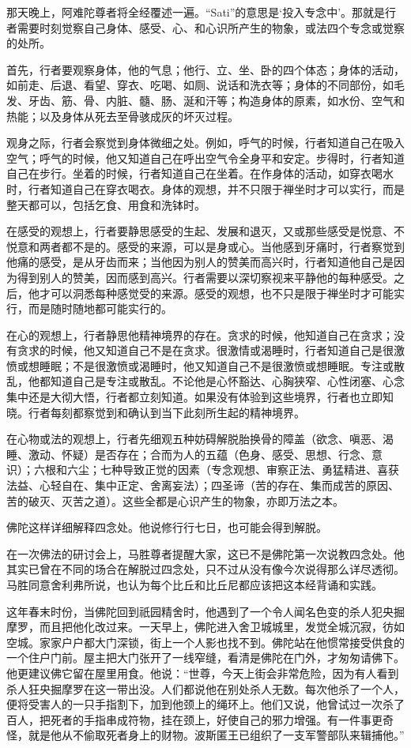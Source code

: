 \documentclass[12pt,twoside,openany]{book}
\begin{document}
那天晚上，阿难陀尊者将全经覆述一遍。“Sati”的意思是‘投入专念中’。那就是行者需要时刻觉察自己身体、感受、心、和心识所产生的物象，或法四个专念或觉察的处所。

首先，行者要观察身体，他的气息；他行、立、坐、卧的四个体态；身体的活动，如前走、后退、看望、穿衣、吃喝、如厕、说话和洗衣等；身体的不同部份，如毛发、牙齿、筋、骨、内脏、髓、肠、涎和汗等；构造身体的原素，如水份、空气和热能；以及身体从死去至骨骇成灰的坏灭过程。

观身之际，行者会察觉到身体微细之处。例如，呼气的时候，行者知道自己在吸入空气；呼气的时候，他又知道自己在呼出空气令全身平和安定。步得时，行者知道自己在步行。坐着的时候，行者知道自己在坐着。在作身体的活动，如穿衣喝水时，行者知道自己在穿衣喝衣。身体的观想，并不只限于禅坐时才可以实行，而是整天都可以，包括乞食、用食和洗钵时。

在感受的观想上，行者要静思感受的生起、发展和退灭，又或那些感受是悦意、不悦意和两者都不是的。感受的来源，可以是身或心。当他感到牙痛时，行者察觉到他痛的感受，是从牙齿而来；当他因为别人的赞美而高兴时，行者知道他自己是因为得到别人的赞美，因而感到高兴。行者需要以深切察视来平静他的每种感受。之后，他才可以洞悉每种感觉受的来源。感受的观想，也不只是限于禅坐时才可能实行，而是随时随地都可能实行的。

在心的观想上，行者静思他精神境界的存在。贪求的时候，他知道自己在贪求；没有贪求的时候，他又知道自己不是在贪求。很激情或渴睡时，行者知道自己是很激愤或想睡眠；不是很激愤或渴睡时，他又知道自己不是很激愤或想睡眠。专注或散乱，他都知道自己是专注或散乱。不论他是心怀豁达、心胸狭窄、心性闭塞、心念集中还是大彻大悟，行者都立刻知道。如果没有体验到这些境界，行者也立即知晓。行者每刻都察觉到和确认到当下此刻所生起的精神境界。

在心物或法的观想上，行者先细观五种妨碍解脱胎换骨的障盖（欲念、嗔恶、渴睡、激动、怀疑）是否存在；合而为人的五蕴（色身、感受、思想、行念、意识）；六根和六尘；七种导致正觉的因素（专念观想、审察正法、勇猛精进、喜获法益、心轻自在、集中正定、舍离妄法）；四圣谛（苦的存在、集而成苦的原因、苦的破灭、灭苦之道）。这些全都是心识产生的物象，亦即万法之本。

佛陀这样详细解释四念处。他说修行行七日，也可能会得到解脱。

在一次佛法的研讨会上，马胜尊者提醒大家，这已不是佛陀第一次说教四念处。他其实已曾在不同的场合在解脱过四念处，只不过从没有像今次说得那么详尽透彻。马胜同意舍利弗所说，也认为每个比丘和比丘尼都应该把这本经背诵和实践。

这年春末时份，当佛陀回到祇园精舍时，他遇到了一个令人闻名色变的杀人犯央掘摩罗，而且把他化改过来。一天早上，佛陀进入舍卫城城里，发觉全城沉寂，彷如空城。家家户户都大门深锁，街上一个人影也找不到。佛陀站在他惯常接受供食的一个住户门前。屋主把大门张开了一线窄缝，看清是佛陀在门外，才匆匆请佛下。他更建议佛它留在屋里用食。他说：“世尊，今天上街会非常危险，因为有人看到杀人狂央掘摩罗在这一带出没。人们都说他在别处杀人无数。每次他杀了一个人，便将受害人的一只手指割下，加到他颈上的绳环上。他们又说，他曾试过一次杀了百人，把死者的手指串成符物，挂在颈上，好使自己的邪力增强。有一件事更奇怪，就是他从不偷取死者身上的财物。波斯匿王已组织了一支军警部队来辑捕他。”
\end{document}
